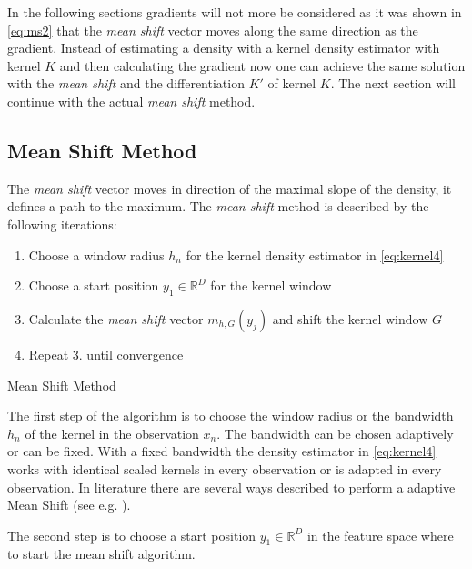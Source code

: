 In the following sections gradients will not more be considered as it
was shown in \autoref{eq:ms2} that the \emph{mean shift} vector moves
along the same direction as the gradient. Instead of estimating a
density with a kernel density estimator with kernel $K$ and then
calculating the gradient now one can achieve the same solution with
the \emph{mean shift} and the differentiation $K'$ of kernel $K$. The
next section will continue with the actual \emph{mean shift} method.

\subsection{Mean Shift Method}
\label{sec:mean_shift_method}

The \emph{mean shift} vector moves in direction of the maximal slope
of the density, it defines a path to the maximum. The \emph{mean
  shift} method is described by the following iterations:

\begin{algorithm2e}[H]

  \begin{enumerate}%
  \item Choose a window radius $h_n$ for the kernel density estimator
    in \autoref{eq:kernel4}
  \item Choose a start position $y_1 \in \mathbb{R}^D$ for the kernel
    window
  \item Calculate the \emph{mean shift} vector $m_{h,G}(y_j)$ and
    shift the kernel window $G$
  \item Repeat 3. until convergence
  \end{enumerate}

  \caption{Mean Shift Method}
  \label{alg:ms}
\end{algorithm2e}

The first step of the algorithm is to choose the window radius or the
bandwidth $h_n$ of the kernel in the observation $x_n$. The bandwidth
can be chosen adaptively or can be fixed. With a fixed bandwidth the
density estimator in \autoref{eq:kernel4} works with identical scaled
kernels in every observation or is adapted in every observation. In
literature there are several ways described to perform a adaptive Mean
Shift (see e.g. \citeauthor{citeulike:4910570}
\citep{citeulike:4910570}).

The second step is to choose a start position $y_1 \in \mathbb{R}^D$
in the feature space where to start the mean shift algorithm.


